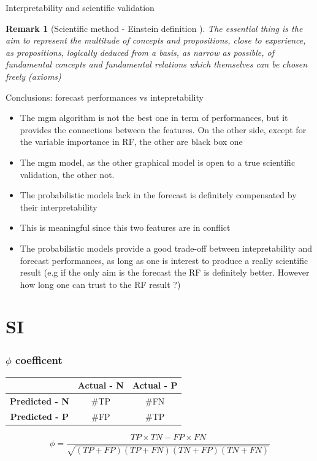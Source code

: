 \documentclass{beamer}
\newtheorem*{remark}{Remark}
\begin{document}
\begin{frame}{Interpretability and scientific validation}

\begin{remark}[Scientific method - Einstein definition ]
The essential thing is the aim to represent the multitude of concepts and propositions, close to experience, as propositions, logically deduced from a basis, as narrow as possible, of fundamental concepts and fundamental relations which themselves can be chosen freely (axioms) \cite{physics-reality}
\end{remark}

\end{frame}


\begin{frame}{Conclusions: forecast performances vs intepretability}
\begin{itemize}
\item The mgm algorithm is not the best one in term of performances, but it provides the connections between the features. On the other side, except for the variable importance in RF, the other are black box one
\item The mgm model, as the other graphical model is open to a true scientific validation, the other not. 
\item The probabilistic models lack in the forecast is definitely compensated by their interpretability 
\item This is meaningful since this two features are in conflict 
\item The probabilistic models provide a good trade-off between intepretability and forecast performances, as long as one is interest to produce a really scientific result (e.g if the only aim is the forecast the RF is definitely better. However how long one can trust to the RF result ?)
\end{itemize}
\end{frame}

\section{SI}

\begin{frame}
\begin{center}
\frametitle{$\phi$ coefficent}
\begin{table}[]
\begin{tabular}{c|c|c}
\multicolumn{1}{l|}{\textbf{}} & \textbf{Actual - N} & \textbf{Actual - P} \\ \hline
\textbf{Predicted - N}         & \#TP                & \#FN                \\ \hline
\textbf{Predicted - P}         & \#FP                & \#TP               
\end{tabular}
\end{table}
\begin{equation*}
\phi=\dfrac{TP\times TN - FP\times FN}{\sqrt{\left(TP+FP\right)\left(TP+FN\right)\left(TN+FP\right)\left(TN+FN\right)}}
\end{equation*}
\end{center}
\end{frame}
\end{document}
